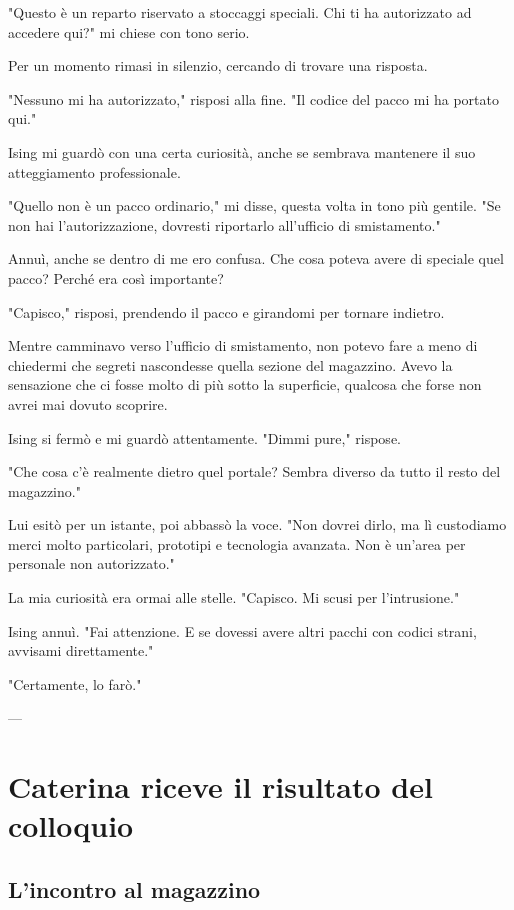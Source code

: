 "Questo è un reparto riservato a stoccaggi speciali. Chi ti ha autorizzato ad accedere qui?" mi chiese con tono serio.

Per un momento rimasi in silenzio, cercando di trovare una risposta.

"Nessuno mi ha autorizzato," risposi alla fine. "Il codice del pacco mi ha portato qui."

Ising mi guardò con una certa curiosità, anche se sembrava mantenere il suo atteggiamento professionale.

"Quello non è un pacco ordinario," mi disse, questa volta in tono più gentile. "Se non hai l’autorizzazione, dovresti riportarlo all'ufficio di smistamento."

Annuì, anche se dentro di me ero confusa. Che cosa poteva avere di speciale quel pacco? Perché era così importante?

"Capisco," risposi, prendendo il pacco e girandomi per tornare indietro.

Mentre camminavo verso l'ufficio di smistamento, non potevo fare a meno di chiedermi che segreti nascondesse quella sezione del magazzino. Avevo la sensazione che ci fosse molto di più sotto la superficie, qualcosa che forse non avrei mai dovuto scoprire.


Ising si fermò e mi guardò attentamente. "Dimmi pure," rispose.

"Che cosa c'è realmente dietro quel portale? Sembra diverso da tutto il resto del magazzino."

Lui esitò per un istante, poi abbassò la voce. "Non dovrei dirlo, ma lì custodiamo merci molto particolari, prototipi e tecnologia avanzata. Non è un'area per personale non autorizzato."

La mia curiosità era ormai alle stelle. "Capisco. Mi scusi per l'intrusione."

Ising annuì. "Fai attenzione. E se dovessi avere altri pacchi con codici strani, avvisami direttamente."

"Certamente, lo farò."

---

\section{Caterina riceve il risultato del colloquio}

\subsection{L'incontro al magazzino}

